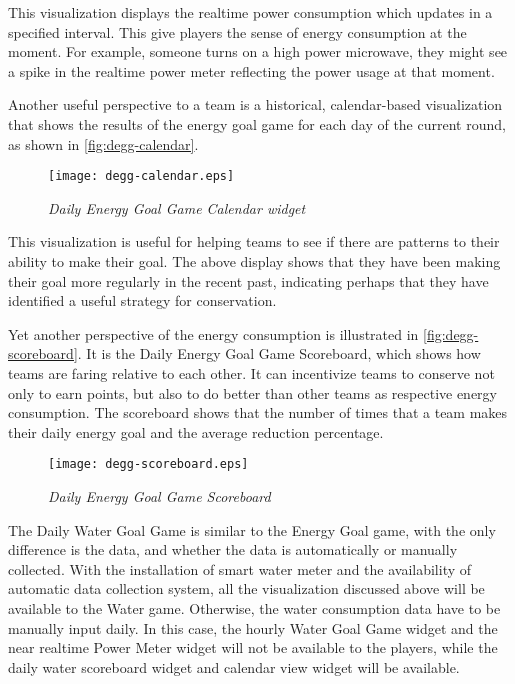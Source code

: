 This visualization displays the realtime power consumption which updates in a specified interval. This give players the sense of energy consumption at the moment. For example, someone turns on a high power microwave, they might see a spike in the realtime power meter reflecting the power usage at that moment.

Another useful perspective to a team is a historical, calendar-based visualization that shows the results of the energy goal game for each day of the current round, as shown in \autoref{fig:degg-calendar}.

\begin{figure}[!ht]
  \center
  \texttt{[image: degg-calendar.eps]}
  \caption{\em Daily Energy Goal Game Calendar widget}
  \label{fig:degg-calendar}
\end{figure}

This visualization is useful for helping teams to see if there are patterns to their ability to make their goal. The above display shows that they have been making their goal more regularly in the recent past, indicating perhaps that they have identified a useful strategy for conservation.

Yet another perspective of the energy consumption is illustrated in \autoref{fig:degg-scoreboard}. It is the Daily Energy Goal Game Scoreboard, which shows how teams are faring relative to each other. It can incentivize teams to conserve not only to earn points, but also to do better than other teams as respective energy consumption. The scoreboard shows that the number of times that a team makes their daily energy goal and the average reduction percentage.

\begin{figure}[!ht]
  \center
  \texttt{[image: degg-scoreboard.eps]}
  \caption{\em Daily Energy Goal Game Scoreboard}
  \label{fig:degg-scoreboard}
\end{figure}

The Daily Water Goal Game is similar to the Energy Goal game, with the only difference is the data, and whether the data is automatically or manually collected. With the installation of smart water meter and the availability of automatic data collection system, all the visualization discussed above will be available to the Water game. Otherwise, the water consumption data have to be manually input daily. In this case, the hourly Water Goal Game widget and the near realtime Power Meter widget will not be available to the players, while the daily water scoreboard widget and calendar view widget will be available.

